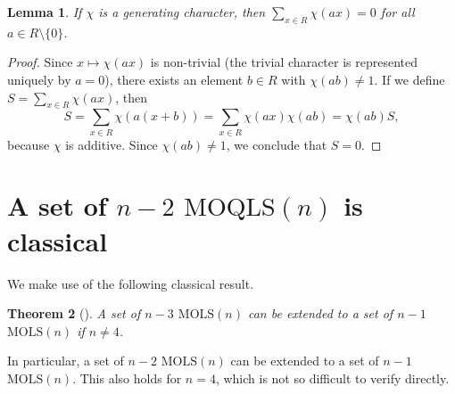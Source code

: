 \documentclass[a4paper]{article}
\newtheorem{theorem}{Theorem}
\newtheorem{lemma}[theorem]{Lemma}
\theoremstyle{definition}
\newcommand{\MOLS}[1]{\(\mathrm{MOLS}(#1)\)}
\newcommand{\MOQLS}[1]{\(\mathrm{MOQLS}(#1)\)}
\begin{document}
\begin{lemma}\label{lem:frobenius}
If \(\chi\) is a generating character, then \(\sum_{x\in R}\chi(ax)=0\) for all \(a\in R\setminus\{0\}\).
\end{lemma}
\begin{proof}
Since \(x\mapsto\chi(ax)\) is non-trivial (the trivial character is represented uniquely by \(a=0\)), there exists an element \(b\in R\) with \(\chi(ab)\neq1\). If we define \(S=\sum_{x\in R}\chi(ax)\), then
\[S=\sum_{x\in R}\chi(a(x+b))=\sum_{x\in R}\chi(ax)\chi(ab)=\chi(ab)S,\]
because $\chi$ is additive. Since \(\chi(ab)\neq1\), we conclude that $S=0$.
\end{proof}

\section{\texorpdfstring{A set of \(n-2\) \MOQLS{n} is classical}{A set of n-2 MOQLS(n) is classical}}\label{sec:n-2}

We make use of the following classical result.

\begin{theorem}[\cite{Shrikhande}]\label{thm:bruckcompletion}
    A set of \(n-3\) \MOLS{n} can be extended to a set of \(n-1\) \MOLS{n} if \(n\neq4\).
\end{theorem}

In particular, a set of \(n-2\) \MOLS{n} can be extended to a set of \(n-1\) \MOLS{n}. This also holds for \(n=4\), which is not so difficult to verify directly.
\end{document}
